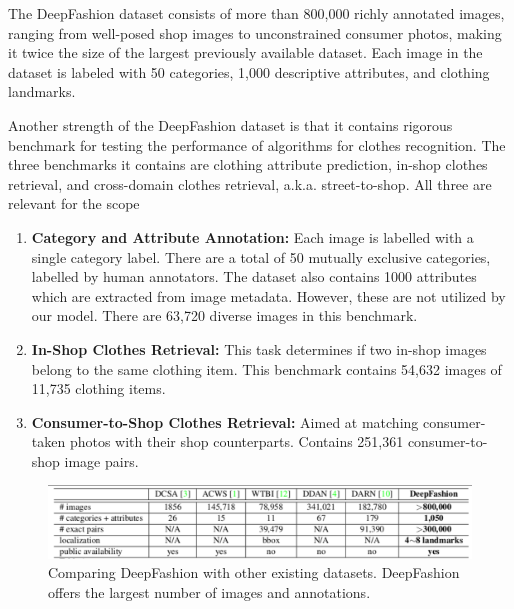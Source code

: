 The DeepFashion dataset consists of more than 800,000 richly annotated images, ranging from well-posed shop images to unconstrained consumer photos, making it twice the size of the largest previously available dataset. Each image in the dataset is labeled with 50 categories, 1,000 descriptive attributes, and clothing landmarks.

Another strength of the DeepFashion dataset is that it contains rigorous benchmark for testing the performance of algorithms for clothes recognition. The three benchmarks it contains are clothing attribute prediction, in-shop clothes retrieval, and cross-domain clothes retrieval, a.k.a. street-to-shop. All three are relevant for the scope 

\begin{enumerate}
	\item \textbf{Category and Attribute Annotation:} Each image is labelled with a single category label. There are a total of 50 mutually exclusive categories, labelled by human annotators. The dataset also contains 1000 attributes which are extracted from image metadata. However, these are not utilized by our model. There are 63,720 diverse images in this benchmark.
	
	\item \textbf{In-Shop Clothes Retrieval:} This task determines if two in-shop images belong to the same clothing item. This benchmark contains 54,632 images of 11,735 clothing items.  
	
	\item \textbf{Consumer-to-Shop Clothes Retrieval:} Aimed at matching consumer-taken photos with their shop counterparts. Contains 251,361 consumer-to-shop image pairs.
\end{enumerate}

\begin{figure}[H]
\includegraphics[width=15cm]{images/dataset-comparision.pdf} 
\centering
\caption{Comparing DeepFashion with other existing datasets. DeepFashion offers the largest number of images and annotations.}
\label{dataset:home}
\end{figure}

 
